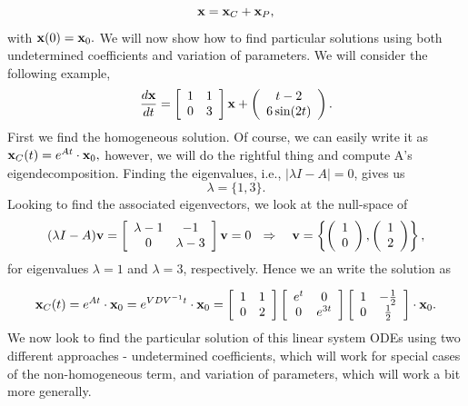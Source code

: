 $${\bf{x}} = {\bf{x}}_C + {\bf{x}}_P,$$
%
with ${\bf{x}}(0) = {\bf{x}}_0.$ We will now show how to find particular solutions using both undetermined coefficients and variation of parameters. We will consider the following example,
$$\frac{d{\bf{x}}}{dt} = \left[ \begin{array}{cc} 1 & 1 \\ 0 & 3  \\  \end{array}\right]{\bf{x}} + \left( \begin{array}{c}  t-2 \\  6\sin(2t)  \end{array} \right).$$
%
First we find the homogeneous solution. Of course, we can easily write it as ${\bf{x}}_C(t) = e^{At}\cdot{\bf{x}}_0,$ however, we will do the rightful thing and compute A's eigendecomposition. Finding the eigenvalues, i.e., $\big|\lambda I - A\big| = 0$, gives us $$\lambda = \{1,3\}.$$
%
Looking to find the associated eigenvectors, we look at the null-space of $$(\lambda I - A){\bf{v}} = \left[ \begin{array}{cc} \lambda-1 & -1 \\ 0 & \lambda-3   \end{array} \right]{\bf{v}}  = 0  \ \ \Rightarrow \ \ \ {\bf{v}} = \left\{  \left( \begin{array}{c} 1\\ 0 \\ \end{array} \right), \left(  \begin{array}{c} 1\\  2 \\ \end{array}  \right)     \right\},$$
%
for eigenvalues $\lambda=1$ and $\lambda=3$, respectively. Hence we an write the solution as

$${\bf{x}}_C(t) = e^{At}\cdot {\bf{x}}_0 = e^{VDV^{-1}t}\cdot {\bf{x}}_0 = \left[ \begin{array}{cc} 1 & 1\\ 0 & 2\\ \end{array} \right] \left[ \begin{array}{cc} e^{t} & 0 \\ 0 & e^{3t} \\ \end{array} \right] \left[ \begin{array}{cc} 1 & -\frac{1}{2} \\ 0 &  \frac{1}{2} \\ \end{array} \right] \cdot {\bf{x}}_0.$$
%
We now look to find the particular solution of this linear system ODEs using two different approaches - undetermined coefficients, which will work for special cases of the non-homogeneous term, and variation of parameters, which will work a bit more generally. \\


